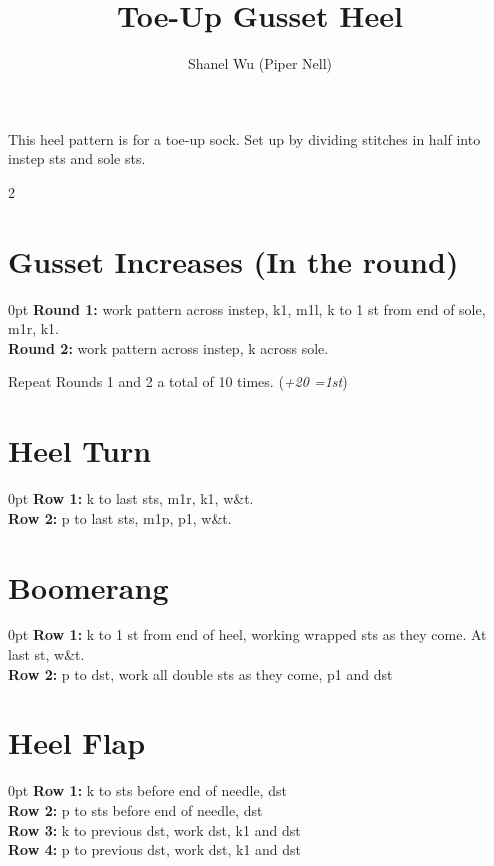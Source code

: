 \documentclass[12pt]{article}
\title{Toe-Up Gusset Heel} %
\author{Shanel Wu (Piper Nell)}
\newcommand{\rowDir}[1]{\textbf{#1:}} %
\newcommand{\blank}{\underline{\hspace{2em}} } %
\newcommand{\increase}[1]{(\emph{+#1 
	\ifnum#1=1{st}\else{sts}\fi})}
\newenvironment{unframed}
    {%
	\begin{addmargin}[2em]{0pt}
	\setlength{\parindent}{-2em}}
    {%
	\setlength{\parindent}{0em}
	\end{addmargin}}
\begin{document}

{\selectfont
\HUGE\textbf{\thetitle}
}

\vspace{1em}
This heel pattern is for a toe-up sock. Set up by dividing stitches in half into instep sts and sole sts.

\begin{multicols}{2}
\section*{Gusset Increases (In the round)}
\begin{unframed}
\rowDir{Round 1} work pattern across instep, k1, m1l, k to 1 st from end of sole, m1r, k1. \\
\rowDir{Round 2} work pattern across instep, k across sole.
\end{unframed}

Repeat Rounds 1 and 2 a total of 10 times. \increase{20}

\section*{Heel Turn}
\begin{unframed}
\rowDir{Row 1} k \blank to last \blank sts, m1r, k1, w\&t. \\
\rowDir{Row 2} p \blank to last \blank sts, m1p, p1, w\&t.
\end{unframed}

\section*{Boomerang}
\begin{unframed}
\rowDir{Row 1} k to 1 st from end of heel, working wrapped sts as they come. At last st, w\&t. \\
\rowDir{Row 2} p to dst, work all double sts as they come, p1 and dst \\
\end{unframed} 

\section*{Heel Flap}
\begin{unframed}
\rowDir{Row 1} k to \blank sts before end of needle, dst \\
\rowDir{Row 2} p to \blank sts before end of needle, dst \\
\rowDir{Row 3} k to previous dst, work dst, k1 and dst \\
\rowDir{Row 4} p to previous dst, work dst, k1 and dst
\end{unframed} \vspace{1em}


\end{multicols}
\end{document}
